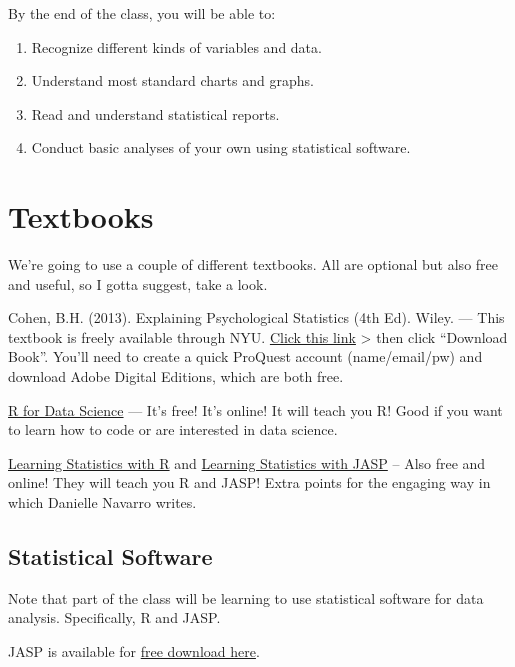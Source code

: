 \documentclass[
]{book}
\providecommand{\tightlist}{%
  \setlength{\itemsep}{0pt}\setlength{\parskip}{0pt}}
\begin{document}
By the end of the class, you will be able to:

\begin{enumerate}
\def\labelenumi{\arabic{enumi}.}
\tightlist
\item
  Recognize different kinds of variables and data.
\item
  Understand most standard charts and graphs.
\item
  Read and understand statistical reports.
\item
  Conduct basic analyses of your own using statistical software.
\end{enumerate}

\hypertarget{textbooks}{%
\section{Textbooks}\label{textbooks}}

We're going to use a couple of different textbooks. All are optional but also free and useful, so I gotta suggest, take a look.

Cohen, B.H. (2013). Explaining Psychological Statistics (4th Ed). Wiley. --- This textbook is freely available
through NYU. \href{https://ebookcentral.proquest.com/lib/nyulibrary-ebooks/detail.action?docID=1563061}{Click this link} \textgreater{} then click ``Download Book''. You'll need to create a quick ProQuest account (name/email/pw) and download Adobe Digital Editions, which are both free.

\href{https://r4ds.had.co.nz/}{R for Data Science} --- It's free! It's online! It will teach you R! Good if you want to learn how to code or are interested in data science.

\href{https://learningstatisticswithr.com/}{Learning Statistics with R} and \href{https://learnstatswithjasp.com/}{Learning Statistics with JASP} -- Also free and online! They will teach you R and JASP! Extra points for the engaging way in which Danielle Navarro writes.

\hypertarget{statistical-software}{%
\subsection{Statistical Software}\label{statistical-software}}

Note that part of the class will be learning to use statistical software for data analysis. Specifically, R and JASP.

JASP is available for \href{https://jasp-stats.org/download/}{free download here}.
\end{document}
